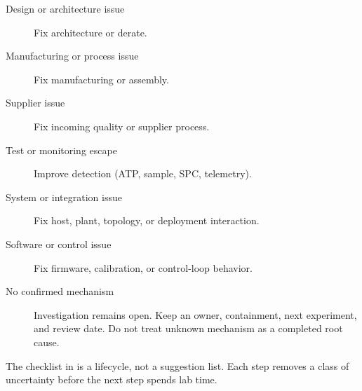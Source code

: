 \begin{description}
\item[Design or architecture issue] Fix architecture or derate.
\item[Manufacturing or process issue] Fix manufacturing or assembly.
\item[Supplier issue] Fix incoming quality or supplier process.
\item[Test or monitoring escape] Improve detection (ATP, sample, SPC,
      telemetry).
\item[System or integration issue] Fix host, plant, topology, or deployment
      interaction.
\item[Software or control issue] Fix firmware, calibration, or control-loop
      behavior.
\item[No confirmed mechanism] Investigation remains open. Keep an owner,
      containment, next experiment, and review date. Do not treat unknown
      mechanism as a completed root cause.
\end{description}

\label{sec:failure-analysis-checklist}
The checklist in  is a lifecycle, not a
suggestion list. Each step removes a class of uncertainty before the next step
spends lab time.


